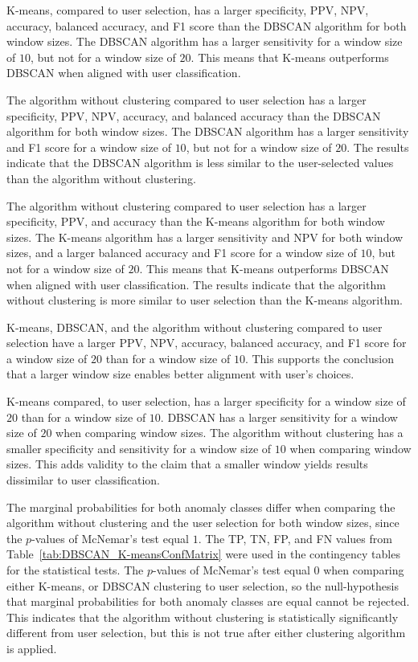 \documentclass[preprint,12pt]{elsarticle}
\begin{document}
K-means, compared to user selection, has a larger specificity, PPV, NPV, accuracy, balanced accuracy, and F1 score than the DBSCAN algorithm for both window sizes. The DBSCAN algorithm has a larger sensitivity for a window size of $10$, but not for a window size of $20$. This means that K-means outperforms DBSCAN when aligned with user classification.

The algorithm without clustering compared to user selection has a larger specificity, PPV, NPV, accuracy, and balanced accuracy than the DBSCAN algorithm for both window sizes. The DBSCAN algorithm has a larger sensitivity and F1 score for a window size of $10$, but not for a window size of $20$. The results indicate that the DBSCAN algorithm is less similar to the user-selected values than the algorithm without clustering.

The algorithm without clustering compared to user selection has a larger specificity, PPV, and accuracy than the K-means algorithm for both window sizes. The K-means algorithm has a larger sensitivity and NPV for both window sizes, and a larger balanced accuracy and F1 score for a window size of $10$, but not for a window size of $20$. This means that K-means outperforms DBSCAN when aligned with user classification. The results indicate that the algorithm without clustering is more similar to user selection than the K-means algorithm.

K-means, DBSCAN, and the algorithm without clustering compared to user selection have a larger PPV, NPV, accuracy, balanced accuracy, and F1 score for a window size of $20$ than for a window size of $10$. This supports the conclusion that a larger window size enables better alignment with user's choices.

K-means compared, to user selection, has a larger specificity for a window size of $20$ than for a window size of $10$. DBSCAN has a larger sensitivity for a window size of $20$ when comparing window sizes. The algorithm without clustering has a smaller specificity and sensitivity for a window size of $10$ when comparing window sizes. This adds validity to the claim that a smaller window yields results dissimilar to user classification.

The marginal probabilities for both anomaly classes differ when comparing the algorithm without clustering and the user selection for both window sizes, since the $p$-values of McNemar's test equal $1$. The TP, TN, FP, and FN values from Table~\ref{tab:DBSCAN_K-meansConfMatrix} were used in the contingency tables for the statistical tests.  The $p$-values of McNemar's test equal $0$ when comparing either K-means, or DBSCAN clustering to user selection, so the null-hypothesis that marginal probabilities for both anomaly classes are equal cannot be rejected. This indicates that the algorithm without clustering is statistically significantly different from user selection, but this is not true after either clustering algorithm is applied.
\end{document}
